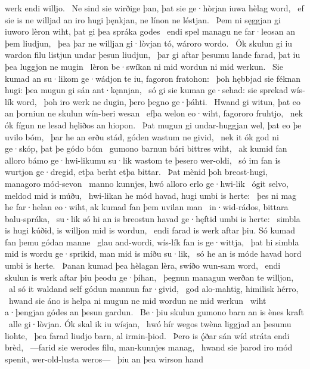 werk endi willjo. \hld\ Ne sind sie wirðige þan,
þat sie ge·hòrjan iuwa hèlag word, \hld\ ef sie is ne willjad an iro hugi þęnkjan,
ne línon ne léstjan. \hld\ Þem ni sęggjan gi iuworo lèron wiht,
þat gi þea spráka godes \hld\ endi spel managu
ne far·leosan an þem liudjun, \hld\ þea þar ne willjan gi·lòvjan tó,
wároro wordo. \hld\ Ók skulun gi iu wardon filu
listjun undar þesun liudjun, \hld\ þar gi aftar þesumu lande farad,
þat iu þea luggjon ne mugin \hld\ lèron be·swíkan
ni mid wordun ni mid werkun. \hld\ Sie kumad an su·likom ge·wádjon te iu,
fagoron fratohon: \hld\ þoh hębbjad sie féknan hugi:
þea mugun gi sán ant·kęnnjan, \hld\ só gi sie kuman ge·sehad:
sie sprekad wís-lík word, \hld\ þoh iro werk ne dugin,
þero þegno ge·þáhti. \hld\ Hwand gi witun, þat eo an þorniun ne skulun
wín-beri wesan \hld\ efþa welon eo·wiht,
fagororo fruhtjo, \hld\ nek ók fígun ne lesad
hęliðos an hiopon. \hld\ Þat mugun gi undar-huggjan wel,
þat eo þe uvilo bóm, \hld\ þar he an erðu stád,
góden wastum ne givid, \hld\ nek it ók god ni ge·skóp,
þat þe gódo bóm \hld\ gumono barnun
bári bittres wiht, \hld\ ak kumid fan alloro bámo ge·hwi-likumu
su·lik wastom te þesero wer-oldi, \hld\ só im fan is wurtjon ge·dregid,
etþa berht etþa bittar. \hld\ Þat mènid þoh breost-hugi,
managoro mód-sevon \hld\ manno kunnjes,
hwó alloro erlo ge·hwi-lik \hld\ ógit selvo,
meldod mid is múðu, \hld\ hwi-likan he mód havad,
hugi umbi is herte: \hld\ þes ni mag he far·helan eo·wiht,
ak kumad fan þem uvilan man \hld\ in·wid-rádos,
bittara balu-spráka, \hld\ su·lik só hi an is breostun havad
ge·hęftid umbi is herte: \hld\ simbla is hugi kúðid,
is willjon mid is wordun, \hld\ endi farad is werk aftar þiu.
Só kumad fan þemu gódan manne \hld\ glau and-wordi,
wís-lík fan is ge·wittja, \hld\ þat hi simbla mid is wordu ge·sprikid,
man mid is míðu su·lik, \hld\ só he an is móde havad
hord umbi is herte. \hld\ Þanan kumad þea hèlagan lèra,
swíðo wun-sam word, \hld\ endi skulun is werk aftar þiu
þeodu ge·þíhan, \hld\ þegnun managun
werðan te willjon, \hld\ al só it waldand self
gódun mannun far·givid, \hld\ god alo-mahtig,
himilisk hérro, \hld\ hwand sie áno is helpa ni mugun
ne mid wordun ne mid werkun \hld\ wiht a·þengjan
gódes an þesun gardun. \hld\ Be·þiu skulun gumono barn
an is ènes kraft \hld\ alle gi·lòvjan.
Ók skal ik iu wísjan, \hld\ hwó hír wegos twèna
liggjad an þesumu liohte, \hld\ þea farad liudjo barn,
al irmin-þiod. \hld\ Þero is ǫ́ðar sán
wíd stráta endi brèd, \hld\ —farid sie werodes filu,
man-kunnjes manag, \hld\ hwand sie þarod iro mód spenit,
wer-old-lusta weros— \hld\ þiu an þea wirson hand
